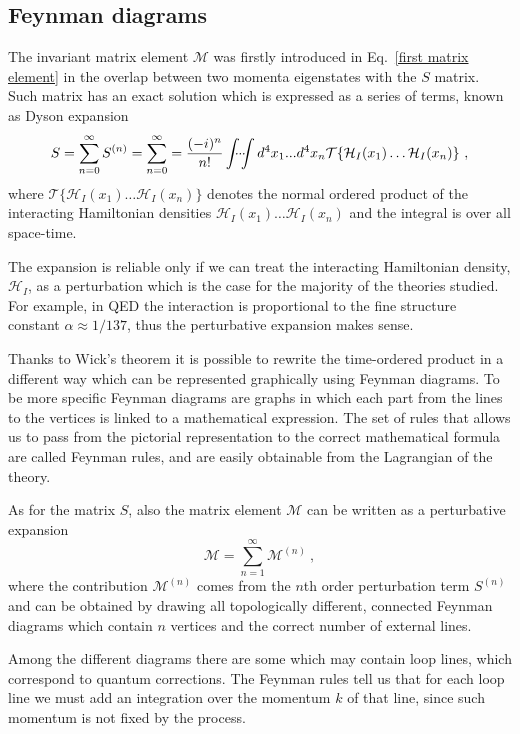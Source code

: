 \documentclass[../main/main.tex]{subfiles}
\begin{document}
\subsection{Feynman diagrams}
The invariant matrix element $\mathcal{M}$ was firstly introduced in Eq.~\ref{first matrix element} in the overlap between two momenta
eigenstates with the $S$ matrix.
Such matrix has an exact solution which is expressed as a series of terms, known as Dyson expansion
\begin{equation}
	\label{S}
	S = \sum_{n = 0}^{\infty} S^{(n)} = \sum_{n = 0}^{\infty} =  \frac{(-i)^n}{n!}\idotsint d^4 x_1 ... d^4 x_n \mathcal{T}\{ \mathcal{H}_I(x_1) \dots \mathcal{H}_I(x_n) \} \ ,
\end{equation}
where $\mathcal{T}\{ \mathcal{H}_I(x_1) \dots \mathcal{H}_I(x_n) \}$ denotes the normal ordered product of the interacting 
Hamiltonian densities $ \mathcal{H}_I(x_1) \dots \mathcal{H}_I(x_n)$ and the integral is over all space-time.

The expansion is reliable only if we can treat the interacting Hamiltonian density, $\mathcal{H}_I$, as a perturbation which is the case for 
the majority of the theories studied. For example, in QED the interaction is proportional to the fine structure constant $\alpha \approx 1/137$, thus the perturbative expansion makes sense.

Thanks to Wick's theorem it is possible to rewrite the time-ordered product in a different way which can be represented graphically using Feynman diagrams. 
To be more specific Feynman diagrams are graphs in which each part from the lines to the vertices is linked to a mathematical expression.
The set of rules that allows us to pass from the pictorial representation to the correct mathematical formula are called Feynman rules, and
are easily obtainable from the Lagrangian of the theory.

As for the matrix $S$, also the matrix element $\mathcal{M}$ can be written as a perturbative expansion
\begin{equation}
	\label{exp M}
	\mathcal{M}= \sum_{n = 1}^{\infty} \mathcal{M}^{(n)} \ ,
\end{equation} 
where the contribution $\mathcal{M}^{(n)} $ comes from the $n$th order perturbation term $S^{(n)}$ and can be obtained by drawing 
all topologically different, connected Feynman diagrams which contain $n$ vertices and the correct number of external lines.

Among the different diagrams there are some which may contain loop lines, which correspond to quantum corrections.
 The Feynman rules tell us that for each loop line we must add an integration over the momentum $k$ of that line, since such momentum is not fixed by the process.
\end{document}
